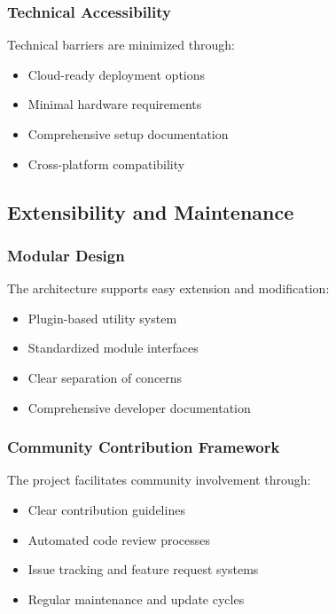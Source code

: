 \subsubsection{Technical Accessibility}

Technical barriers are minimized through:

\begin{itemize}
    \item Cloud-ready deployment options
    \item Minimal hardware requirements
    \item Comprehensive setup documentation
    \item Cross-platform compatibility
\end{itemize}

\subsection{Extensibility and Maintenance}

\subsubsection{Modular Design}

The architecture supports easy extension and modification:

\begin{itemize}
    \item Plugin-based utility system
    \item Standardized module interfaces
    \item Clear separation of concerns
    \item Comprehensive developer documentation
\end{itemize}

\subsubsection{Community Contribution Framework}

The project facilitates community involvement through:

\begin{itemize}
    \item Clear contribution guidelines
    \item Automated code review processes
    \item Issue tracking and feature request systems
    \item Regular maintenance and update cycles
\end{itemize}